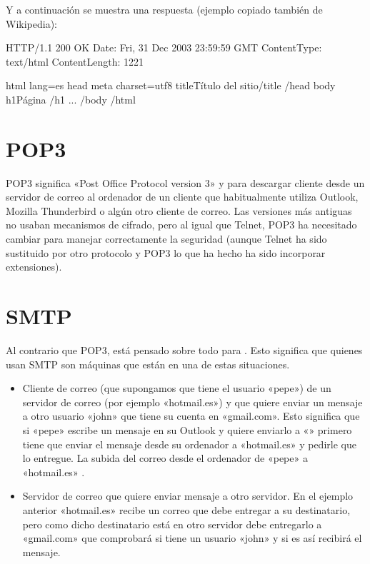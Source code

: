 \documentclass[letterpaper,10pt,spanish]{sphinxmanual}
\begin{document}
Y a continuación se muestra una respuesta (ejemplo copiado también de Wikipedia):

%
\begin{sphinxVerbatim}[commandchars=\\\{\}]
HTTP/1.1 200 OK
Date: Fri, 31 Dec 2003 23:59:59 GMT
Content\PYGZhy{}Type: text/html
Content\PYGZhy{}Length: 1221

\PYGZlt{}html lang=\PYGZdq{}es\PYGZdq{}\PYGZgt{}
\PYGZlt{}head\PYGZgt{}
\PYGZlt{}meta charset=\PYGZdq{}utf\PYGZhy{}8\PYGZdq{}\PYGZgt{}
\PYGZlt{}title\PYGZgt{}Título del sitio\PYGZlt{}/title\PYGZgt{}
\PYGZlt{}/head\PYGZgt{}
\PYGZlt{}body\PYGZgt{}
\PYGZlt{}h1\PYGZgt{}Página \PYGZlt{}/h1\PYGZgt{}
    ...
\PYGZlt{}/body\PYGZgt{}
\PYGZlt{}/html\PYGZgt{}
\end{sphinxVerbatim}


\section{POP3}
\label{\detokenize{textos/tema4:pop3}}
POP3 significa «Post Office Protocol version 3» y  para descargar cliente desde un servidor de correo al ordenador de un cliente que habitualmente utiliza Outlook, Mozilla Thunderbird o algún otro cliente de correo. Las versiones más antiguas no usaban mecanismos de cifrado, pero al igual que Telnet, POP3 ha necesitado cambiar para manejar correctamente la seguridad (aunque Telnet ha sido sustituido por otro protocolo y POP3 lo que ha hecho ha sido incorporar extensiones).


\section{SMTP}
\label{\detokenize{textos/tema4:smtp}}
Al contrario que POP3, está pensado sobre todo para . Esto significa que quienes usan SMTP son máquinas que están en una de estas situaciones.
\begin{itemize}
\item {} 
Cliente de correo (que supongamos que tiene el usuario «pepe») de un servidor de correo (por ejemplo «hotmail.es») y que quiere enviar un mensaje a otro usuario «john» que tiene su cuenta en «gmail.com». Esto significa que si «pepe» escribe un mensaje en su Outlook y quiere enviarlo a «» primero tiene que enviar el mensaje desde su ordenador a «hotmail.es» y pedirle que lo entregue. La subida del correo desde el ordenador de «pepe» a «hotmail.es» .

\item {} 
Servidor de correo que quiere enviar mensaje a otro servidor. En el ejemplo anterior «hotmail.es» recibe un correo que debe entregar a su destinatario, pero como dicho destinatario está en otro servidor debe entregarlo a «gmail.com» que comprobará si tiene un usuario «john» y si es así recibirá el mensaje. 

\end{itemize}
\end{document}
